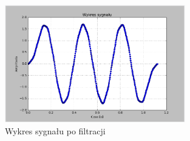 \documentclass{article}
\begin{document}
{{            \begin{figure}[h!]
                \centering
                \includegraphics[width=0.7\textwidth]{img/fil2.png}
                \caption{Wykres sygnału po filtracji}
            \end{figure}
            \FloatBarrier
        }
        \newpage

}
\end{document}
